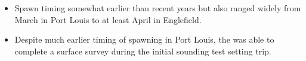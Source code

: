 \begin{itemize}

\item Spawn timing somewhat earlier than recent years but
also ranged widely from March  in Port Louis to
at least April  in Englefield.

\item Despite much earlier timing of spawning in Port Louis, 
the  was able to complete a surface survey
during the initial sounding test setting trip.

\end{itemize}